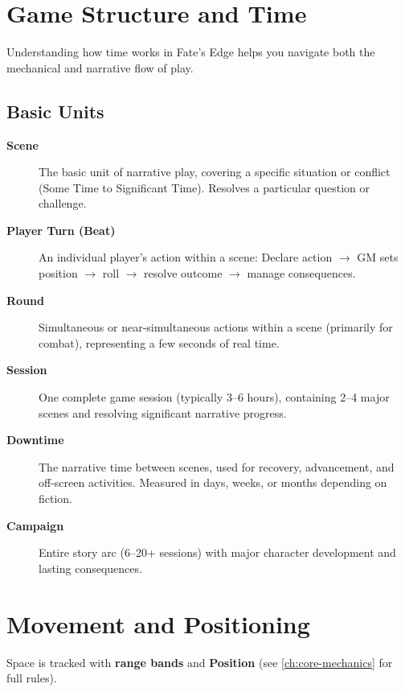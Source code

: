 \section{Game Structure and Time}
\label{sec:game-structure}

Understanding how time works in Fate's Edge helps you navigate both the mechanical and narrative flow of play.

\subsection*{Basic Units}
\label{sec:time-units}
\begin{description}
\item[\textbf{Scene}]  The basic unit of narrative play, covering a specific situation or conflict (Some Time to Significant Time). Resolves a particular question or challenge.
\item[\textbf{Player Turn (Beat)}]  An individual player's action within a scene: Declare action $\rightarrow$ GM sets position $\rightarrow$ roll $\rightarrow$ resolve outcome $\rightarrow$ manage consequences.
\item[\textbf{Round}]  Simultaneous or near-simultaneous actions within a scene (primarily for combat), representing a few seconds of real time.
\item[\textbf{Session}]  One complete game session (typically 3–6 hours), containing 2–4 major scenes and resolving significant narrative progress.
\item[\textbf{Downtime}]  The narrative time between scenes, used for recovery, advancement, and off-screen activities. Measured in days, weeks, or months depending on fiction.
\item[\textbf{Campaign}]  Entire story arc (6–20+ sessions) with major character development and lasting consequences.
\end{description}

\section{Movement and Positioning}
\label{sec:movement-positioning}

Space is tracked with \textbf{range bands} and \textbf{Position} (see \ref{ch:core-mechanics} for full rules).

